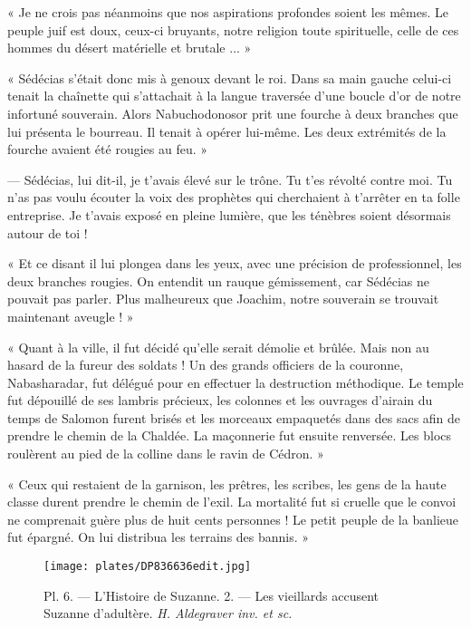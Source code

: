 \documentclass[a4paper, 11pt, oneside, polutonikogreek, french]{article}
\begin{document}
« Je ne crois pas néanmoins que nos aspirations profondes soient les mêmes. Le peuple juif est doux, ceux-ci bruyants, notre religion toute spirituelle, celle de ces hommes du désert matérielle et brutale ... »

« Sédécias s'était donc mis à genoux devant le roi. Dans sa main gauche celui-ci tenait la chaînette qui s'attachait à la langue traversée d'une boucle d'or de notre infortuné souverain. Alors Nabuchodonosor prit une fourche à deux branches que lui présenta le bourreau. Il tenait à opérer lui-même. Les deux extrémités de la fourche avaient été rougies au feu. »

--- Sédécias, lui dit-il, je t'avais élevé sur le trône. Tu t'es révolté contre moi. Tu n'as pas voulu écouter la voix des prophètes qui cherchaient à t'arrêter en ta folle entreprise. Je t'avais exposé en pleine lumière, que les ténèbres soient désormais autour de toi !

« Et ce disant il lui plongea dans les yeux, avec une précision de professionnel, les deux branches rougies. On entendit un rauque gémissement, car Sédécias ne pouvait pas parler. Plus malheureux que Joachim, notre souverain se trouvait maintenant aveugle ! »

\bigskip
\centerline{\EightStarTaper}
\centerline{\EightStarTaper\EightStarTaper}
\bigskip

« Quant à la ville, il fut décidé qu'elle serait démolie et brûlée. Mais non au hasard de la fureur des soldats ! Un des grands officiers de la couronne, Nabasharadar, fut délégué pour en effectuer la destruction méthodique. Le temple fut dépouillé de ses lambris précieux, les colonnes et les ouvrages d'airain du temps de Salomon furent brisés et les morceaux empaquetés dans des sacs afin de prendre le chemin de la Chaldée. La maçonnerie fut ensuite renversée. Les blocs roulèrent au pied de la colline dans le ravin de Cédron. »

« Ceux qui restaient de la garnison, les prêtres, les scribes, les gens de la haute classe durent prendre le chemin de l'exil. La mortalité fut si cruelle que le convoi ne comprenait guère plus de huit cents personnes ! Le petit peuple de la banlieue fut épargné. On lui distribua les terrains des bannis. »

\bigskip
\centerline{\EightStarTaper}
\centerline{\EightStarTaper\EightStarTaper}
\bigskip
\clearpage
\vspace*{\fill}
\begin{figure}[H]
\centering
\texttt{[image: plates/DP836636edit.jpg]}
\caption{Pl. 6. --- L'Histoire de Suzanne. 2. --- Les vieillards accusent Suzanne d'adultère. \emph{H. Aldegraver inv. et sc.}}
\end{figure}
\vspace*{\fill}
\clearpage
\end{document}
